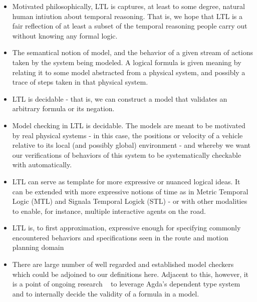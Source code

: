 \documentclass{article}
\begin{document}
\begin{itemize}


\item Motivated philosophically, LTL is captures, at least to some degree,
natural human intiution about temporal reasoning. That is, we hope that LTL is a
fair reflection of at least a subset of the temporal reasoning people carry out
without knowing any formal logic.

\item The semantical notion of model, and the behavior of a given stream of
actions taken by the system being modeled. A logical formula is given meaning by
relating it to some model abstracted from a physical system, and possibly a
trace of steps taken in that physical system.

\item LTL is decidable - that is, we can construct a model that validates an arbitrary formula or its
negation.

\item Model checking in LTL is decidable. The models are meant to be motivated
by real physical systems - in this case, the positions or velocity of a vehicle
relative to its local (and possibly global) environment - and whereby we want
our verifications of behaviors of this system to be systematically checkable
with automatically.

\item LTL can serve as template for more expressive or nuanced logical ideas. It
can be extended with more expressive notions of time as in Metric Temporal Logic
(MTL) and Signala Temporal Logick (STL) - or with other modalities to enable,
for instance, multiple interactive agents on the road.

\item LTL is, to first approximation, expressive enough for specifying commonly
encountered behaviors and specifications seen in the route and motion planning
domain

\item There are large number of well regarded and established model checkers
which could be adjoined to our definitions here. Adjacent to this, however, it
is a point of ongoing research ~\cite{appPf} to leverage Agda's dependent type system
and to internally decide the validity of a formula in a model.

\end{itemize}
\end{document}
